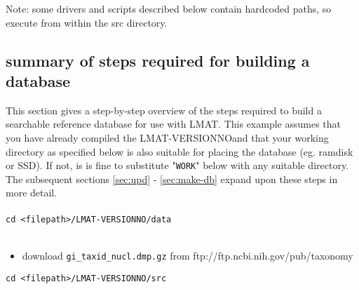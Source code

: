 \documentclass[11pt]{article}
\newcommand{\lmatver}{VERSIONNO}
\begin{document}
Note: some drivers and scripts described below contain hardcoded paths,
      so execute from within the src directory.

\subsection{summary of steps required for building a database} 
This section gives a step-by-step overview of the steps required to build a searchable reference database for use with LMAT.
This example assumes that you have already compiled the LMAT-\lmatver and that your working directory as specified below is also suitable for placing the database (eg. ramdisk or SSD).  If not, is is fine to substitute "\texttt{WORK}" below with any suitable directory.  The subsequent sections \ref{sec:upd} - \ref{sec:make-db} expand upon these steps in more detail.\\
\\
\texttt{cd <filepath>/LMAT-\lmatver/data}\\
\\
\begin{itemize}
\item
download \texttt{gi\_taxid\_nucl.dmp.gz} from ftp://ftp.ncbi.nih.gov/pub/taxonomy
\end{itemize}
\texttt{cd <filepath>/LMAT-\lmatver/src}\\
\end{document}
